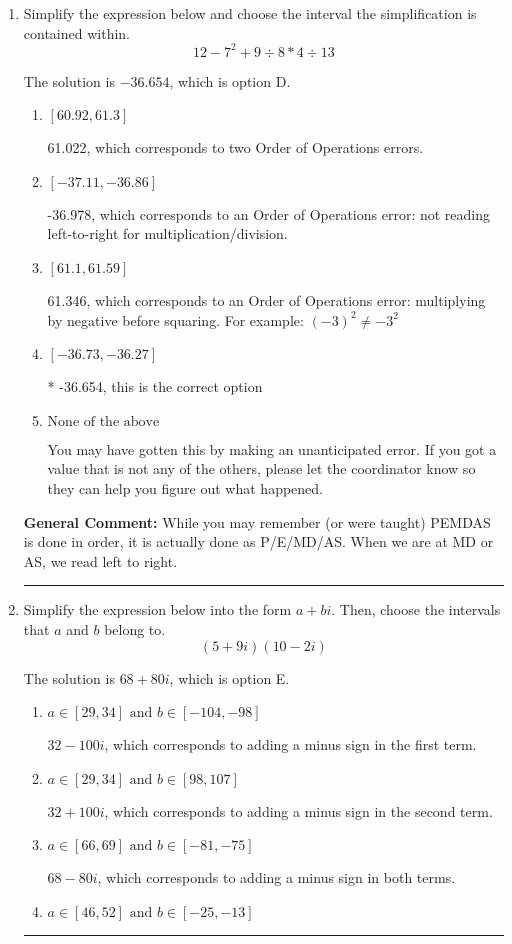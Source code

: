 \documentclass{extbook}[14pt]
\newcommand{\litem}[1]{\item #1

\rule{\textwidth}{0.4pt}}
\begin{document}
\begin{enumerate}\litem{
Simplify the expression below and choose the interval the simplification is contained within.
\[ 12 - 7^2 + 9 \div 8 * 4 \div 13 \]

The solution is \( -36.654 \), which is option D.\begin{enumerate}[label=\Alph*.]
\item \( [60.92, 61.3] \)

 61.022, which corresponds to two Order of Operations errors.
\item \( [-37.11, -36.86] \)

 -36.978, which corresponds to an Order of Operations error: not reading left-to-right for multiplication/division.
\item \( [61.1, 61.59] \)

 61.346, which corresponds to an Order of Operations error: multiplying by negative before squaring. For example: $(-3)^2 \neq -3^2$
\item \( [-36.73, -36.27] \)

* -36.654, this is the correct option
\item \( \text{None of the above} \)

 You may have gotten this by making an unanticipated error. If you got a value that is not any of the others, please let the coordinator know so they can help you figure out what happened.
\end{enumerate}

\textbf{General Comment:} While you may remember (or were taught) PEMDAS is done in order, it is actually done as P/E/MD/AS. When we are at MD or AS, we read left to right.
}
\litem{
Simplify the expression below into the form $a+bi$. Then, choose the intervals that $a$ and $b$ belong to.
\[ (5 + 9 i)(10 - 2 i) \]

The solution is \( 68 + 80 i \), which is option E.\begin{enumerate}[label=\Alph*.]
\item \( a \in [29, 34] \text{ and } b \in [-104, -98] \)

 $32 - 100 i$, which corresponds to adding a minus sign in the first term.
\item \( a \in [29, 34] \text{ and } b \in [98, 107] \)

 $32 + 100 i$, which corresponds to adding a minus sign in the second term.
\item \( a \in [66, 69] \text{ and } b \in [-81, -75] \)

 $68 - 80 i$, which corresponds to adding a minus sign in both terms.
\item \( a \in [46, 52] \text{ and } b \in [-25, -13] \)


\end{enumerate}}
\end{enumerate}
\end{document}

